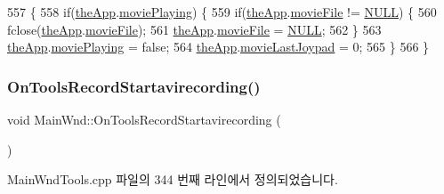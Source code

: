 \begin{DoxyCode}
557 \{
558   \textcolor{keywordflow}{if}(\mbox{\hyperlink{_v_b_a_8cpp_a8095a9d06b37a7efe3723f3218ad8fb3}{theApp}}.\mbox{\hyperlink{class_v_b_a_ac490c27ebc24ea8fbccf42e2909d04ed}{moviePlaying}}) \{
559     \textcolor{keywordflow}{if}(\mbox{\hyperlink{_v_b_a_8cpp_a8095a9d06b37a7efe3723f3218ad8fb3}{theApp}}.\mbox{\hyperlink{class_v_b_a_abf9ac3c15536552d322f20a2dad1f519}{movieFile}} != \mbox{\hyperlink{getopt1_8c_a070d2ce7b6bb7e5c05602aa8c308d0c4}{NULL}}) \{
560       fclose(\mbox{\hyperlink{_v_b_a_8cpp_a8095a9d06b37a7efe3723f3218ad8fb3}{theApp}}.\mbox{\hyperlink{class_v_b_a_abf9ac3c15536552d322f20a2dad1f519}{movieFile}});
561       \mbox{\hyperlink{_v_b_a_8cpp_a8095a9d06b37a7efe3723f3218ad8fb3}{theApp}}.\mbox{\hyperlink{class_v_b_a_abf9ac3c15536552d322f20a2dad1f519}{movieFile}} = \mbox{\hyperlink{getopt1_8c_a070d2ce7b6bb7e5c05602aa8c308d0c4}{NULL}};
562     \}
563     \mbox{\hyperlink{_v_b_a_8cpp_a8095a9d06b37a7efe3723f3218ad8fb3}{theApp}}.\mbox{\hyperlink{class_v_b_a_ac490c27ebc24ea8fbccf42e2909d04ed}{moviePlaying}} = \textcolor{keyword}{false};
564     \mbox{\hyperlink{_v_b_a_8cpp_a8095a9d06b37a7efe3723f3218ad8fb3}{theApp}}.\mbox{\hyperlink{class_v_b_a_a911d9dbab0a3565480a29b8149099ed1}{movieLastJoypad}} = 0;
565   \}
566 \}
\end{DoxyCode}
\mbox{\label{class_main_wnd_ae512a86963451914ea7eee95c85d6280}} 
\subsubsection{\texorpdfstring{On\+Tools\+Record\+Startavirecording()}{OnToolsRecordStartavirecording()}}
{\footnotesize\ttfamily void Main\+Wnd\+::\+On\+Tools\+Record\+Startavirecording (\begin{DoxyParamCaption}{ }\end{DoxyParamCaption})\hspace{0.3cm}{\ttfamily [protected]}}



Main\+Wnd\+Tools.\+cpp 파일의 344 번째 라인에서 정의되었습니다.


